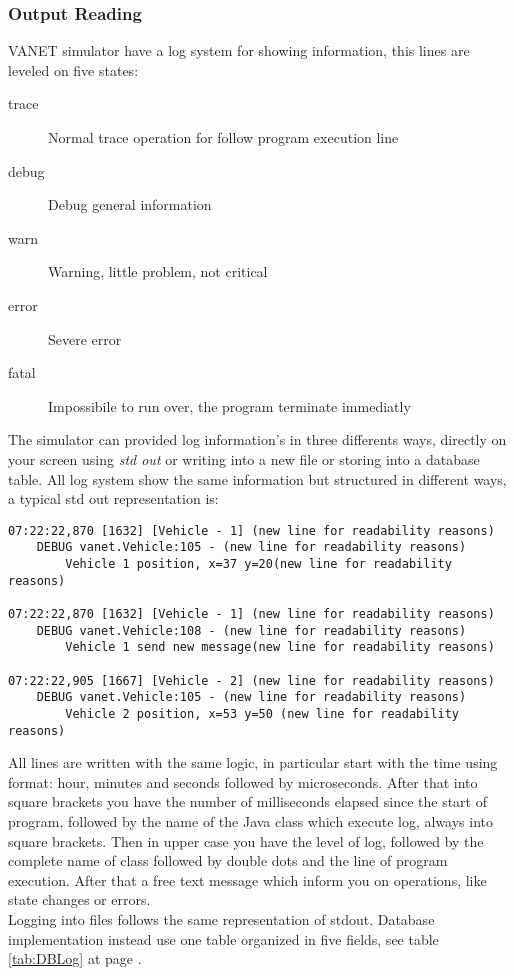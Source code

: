 \subsubsection{Output Reading}
VANET simulator have a log system for showing information, this lines are leveled on five states:
\begin{description}
	\item [trace] Normal trace operation for follow program execution line
	\item [debug] Debug general information
	\item [warn] Warning, little problem, not critical
	\item [error] Severe error
	\item [fatal] Impossibile to run over, the program terminate immediatly
\end{description}
The simulator can provided log  information's in three differents ways, directly on your screen using \textit{std out} or writing into a new file or storing into a database table. All log system show the same information but structured in different ways, a typical std out representation is:
\begin{verbatim}
07:22:22,870 [1632] [Vehicle - 1] (new line for readability reasons)
	DEBUG vanet.Vehicle:105 - (new line for readability reasons)
		Vehicle 1 position, x=37 y=20(new line for readability reasons)
		
07:22:22,870 [1632] [Vehicle - 1] (new line for readability reasons)
	DEBUG vanet.Vehicle:108 - (new line for readability reasons)
		Vehicle 1 send new message(new line for readability reasons)
		
07:22:22,905 [1667] [Vehicle - 2] (new line for readability reasons)
	DEBUG vanet.Vehicle:105 - (new line for readability reasons)
		Vehicle 2 position, x=53 y=50 (new line for readability reasons)
\end{verbatim}
All lines are written with the same logic, in particular start with the time using format: hour, minutes and seconds followed by microseconds. After that into square brackets you have the number of milliseconds elapsed since the start of program, followed by the name of the Java class which execute log, always into square brackets. Then in upper case you have the level of log, followed by the complete name of class followed by double dots and the line of program execution. After that a free text message which inform you on operations, like state changes or errors.\\
Logging into files follows the same representation of stdout. Database implementation instead use one table organized in five fields, see table \ref{tab:DBLog} at page \pageref{tab:DBLog}.
